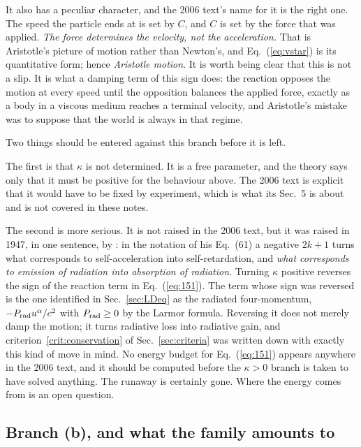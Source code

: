 \documentclass[preprint]{aastex701}
\begin{document}
It also has a peculiar character, and the 2006 text's name for it is the right
one. The speed the particle ends at is set by $C$, and $C$ is set by the force
that was applied. \emph{The force determines the velocity, not the
acceleration.} That is Aristotle's picture of motion rather than Newton's, and
Eq.~(\ref{eq:vstar}) is its quantitative form; hence \emph{Aristotle motion}.
It is worth being clear that this is not a slip. It is what a damping term of
this sign does: the reaction opposes the motion at every speed until the
opposition balances the applied force, exactly as a body in a viscous medium
reaches a terminal velocity, and Aristotle's mistake was to suppose that the
world is always in that regime.

Two things should be entered against this branch before it is left.

The first is that $\kappa$ is not determined. It is a free parameter, and the
theory says only that it must be positive for the behaviour above. The 2006
text is explicit that it would have to be fixed by experiment, which is what
its Sec.~5 is about and is not covered in these notes.

The second is more serious. It is not raised in the 2006 text, but it was
raised in 1947, in one sentence, by \citet{eliezer1947}: in the notation of his
Eq.~(61) a negative $2k+1$ turns what corresponds to self-acceleration into
self-retardation, and \emph{what corresponds to emission of radiation into
absorption of radiation}. Turning $\kappa$ positive reverses the sign of the
reaction term in Eq.~(\ref{eq:151}). The term whose sign was reversed is the one identified in
Sec.~\ref{sec:LDeq} as the radiated four-momentum, $-P_{\rm rad}u^\alpha/c^2$
with $P_{\rm rad}\ge0$ by the Larmor formula. Reversing it does not merely damp
the motion; it turns radiative loss into radiative gain, and
criterion~\ref{crit:conservation} of Sec.~\ref{sec:criteria} was written down
with exactly this kind of move in mind. No energy budget for
Eq.~(\ref{eq:151}) appears anywhere in the 2006 text, and it should be computed
before the $\kappa>0$ branch is taken to have solved anything. The runaway is
certainly gone. Where the energy comes from is an open question.

\subsection{Branch (b), and what the family amounts to}
\label{sec:lk-summary}
\label{sec:branchB}
\end{document}
